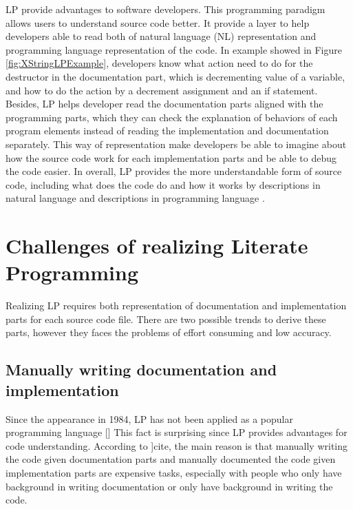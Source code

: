 LP provide advantages to software developers. This programming paradigm allows users to understand source code better. It provide a layer to help developers able to read both of natural language (NL) representation and programming language representation of the code. In example showed in Figure  \ref{fig:XStringLPExample}, developers know what action need to do for the destructor in the documentation part, which is decrementing value of a variable, and how to do the action by a decrement assignment and an if statement. Besides, LP helps developer read the documentation parts aligned with the programming parts, which they can check the explanation of behaviors of each program elements instead of reading the implementation and documentation separately. This way of representation make developers be able to imagine about how the source code work for each implementation parts and be able to debug the code easier. In overall, LP provides the more understandable form of source code, including what does the code do and how it works by descriptions in natural language  and descriptions in programming language .

\section{Challenges of realizing Literate Programming}
Realizing LP requires both representation of documentation and implementation parts for each source code file. There are two possible trends to derive these parts, however they faces the problems of effort consuming and low accuracy.
 
\subsection{Manually writing documentation and implementation}
Since the appearance in 1984, LP has not been applied as a popular programming language [\cite{LPArticle:MainStream1}] This fact is surprising since LP provides advantages for code understanding. According to ]cite{}, the main reason is that manually writing the code given documentation parts and manually documented the code given implementation parts are expensive tasks, especially with people who only have background in writing documentation or only have background in writing the code. 

